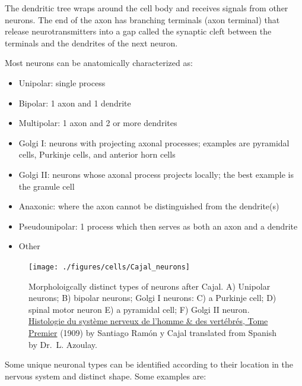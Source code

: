 The dendritic tree wraps around the cell body and receives signals from other neurons. The end of the axon has branching terminals (axon terminal) that release neurotransmitters into a gap called the synaptic cleft between the terminals and the dendrites of the next neuron.

Most neurons can be anatomically characterized as:

\begin{itemize}
\tightlist
\item
  Unipolar: single process
\item
  Bipolar: 1 axon and 1 dendrite
\item
  Multipolar: 1 axon and 2 or more dendrites
\item
  Golgi I: neurons with projecting axonal processes; examples are pyramidal cells, Purkinje cells, and anterior horn cells
\item
  Golgi II: neurons whose axonal process projects locally; the best example is the granule cell
\item
  Anaxonic: where the axon cannot be distinguished from the dendrite(s)
\item
  Pseudounipolar: 1 process which then serves as both an axon and a dendrite
\item
  Other
\end{itemize}



\begin{figure}

{\centering \texttt{[image: ./figures/cells/Cajal\_neurons]} 

}

\caption{Morpholoigcally distinct types of neurons after Cajal. A) Unipolar neurons; B) bipolar neurons; Golgi I neurons: C) a Purkinje cell; D) spinal motor neuron E) a pyramidal cell; F) Golgi II neuron. \href{https://wellcomelibrary.org/item/b2129592x\#?c=0\&m=0\&s=0\&cv=14\&z=0\%2C-3.48\%2C1\%2C8.6591}{Histologie du système nerveux de l'homme \& des vertébrés, Tome Premier} (1909) by Santiago Ramón y Cajal translated from Spanish by Dr.~L. Azoulay.}\label{fig:neurontypes}
\end{figure}

Some unique neuronal types can be identified according to their location in the nervous system and distinct shape. Some examples are:

